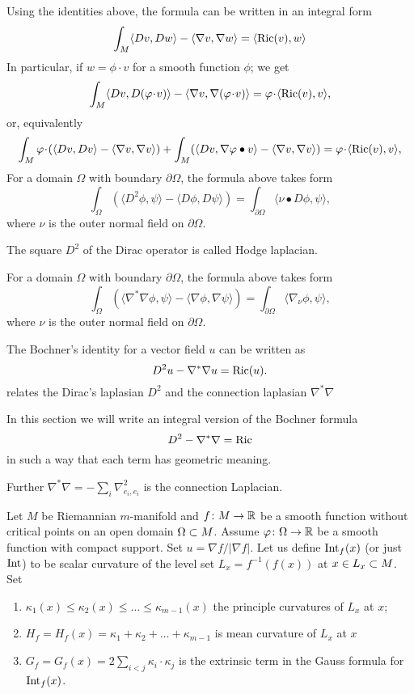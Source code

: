 \documentclass[a4paper,10pt]{article}
\begin{document}
Using the identities above, the formula can be written in an integral form
\[\int_M \langle Dv,Dw\rangle -\langle \nabla v,\nabla w\rangle=\langle \operatorname{Ric}(v),w\rangle\]
In particular, if $w=\phi \cdot v$ for a smooth function $\phi$;
we get
\[\int_M \langle Dv,D(\phi\cdot v)\rangle -\langle \nabla v,\nabla(\phi\cdot v) \rangle=\phi\cdot\langle \Ric(v), v\rangle,\]
or, equivalently
\[\int_M \phi\cdot(\langle Dv,D v\rangle -\langle \nabla v,\nabla v \rangle)
+
\int_M (\langle Dv,\nabla \phi \bullet v\rangle -\langle \nabla v,\nabla v \rangle)
=
\phi\cdot\langle \Ric(v), v\rangle,\]
For a domain $\Omega$ with boundary $\partial \Omega$, the formula above takes form
\[\int_\Omega (\langle D^2\phi,\psi\rangle- \langle D\phi,D\psi\rangle)
=
\int_{\partial \Omega}\langle \nu\bullet D\phi,\psi\rangle,\]
where $\nu$ is the outer normal field on $\partial \Omega$.

The square $D^2$ of the Dirac operator is called Hodge laplacian.


For a domain $\Omega$ with boundary $\partial \Omega$, the formula above takes form
\[\int_\Omega (\langle \nabla^*\nabla\phi,\psi\rangle-\langle \nabla\phi,\nabla\psi\rangle)
=
\int_{\partial \Omega}\langle \nabla_\nu \phi,\psi\rangle,\]
where $\nu$ is the outer normal field on $\partial \Omega$.

The Bochner's identity for a vector field $u$ can be written as
\[D^2 u-\nabla^*\nabla u=\operatorname{Ric}(u).\]
relates the Dirac's laplasian $D^2$ and the connection laplasian $\nabla^*\nabla$

In this section we will write an integral version of the Bochner formula \cite[8.3]{lawson-michelsohn}
\[D^2-\nabla^*\nabla=\operatorname{Ric}\]
in such a way that each term has geometric meaning.


Further $\nabla^*\nabla=-\sum_i\nabla^2_{e_i,e_i}$ is the connection Laplacian.



Let $M$ be Riemannian $m$-manifold and $f\colon M\to\mathbb{R}$ be a smooth function without critical points on an open domain $\Omega\subset M$.
Assume $\varphi\colon\Omega\to\mathbb{R}$ be a smooth function with compact support.
Set $u=\nabla f/|\nabla f|$.
Let us define $\operatorname{Int}_f(x)$ (or just $\operatorname{Int}$) to be scalar curvature of the level set $L_x=f^{-1}(f(x))$ at $x\in L_x\subset M$.
Set
\begin{enumerate}
 \item $\kappa_1(x)\le\kappa_2(x)\le\dots\le\kappa_{m-1}(x)$ the principle curvatures of $L_x$ at $x$;
 \item $H_f=H_f(x)=\kappa_1+\kappa_2+\dots+\kappa_{m-1}$ is mean curvature of $L_x$ at $x$
\item $G_f=G_f(x)=2\sum_{i<j}\kappa_i\cdot\kappa_j$ is the extrinsic term
 in the Gauss formula for $\operatorname{Int}_f(x)$. 
\end{enumerate}
\end{document}
